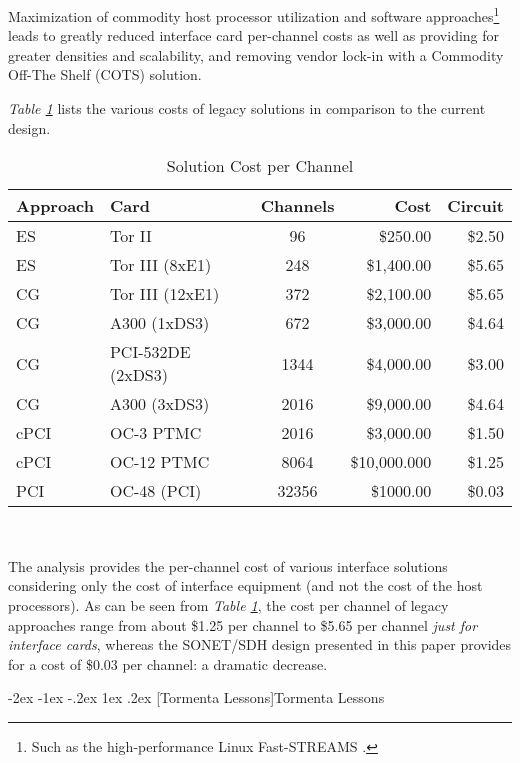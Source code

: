 \documentclass[letterpaper,final,notitlepage,twocolumn,10pt,twoside]{article}
\makeatletter
\let\large = \normalsize
\let\normalsize = \small
\let\small = \footnotesize
\let\footnotesize = \scriptsize
\let\scriptsize = \tiny
\renewcommand\section{\@startsection {section}{1}{\z@}%
                                   {-2ex \@plus -1ex \@minus -.2ex}%
                                   {1ex \@plus .2ex}%
                                   {\normalfont\large\bfseries}}
\makeatother
\begin{document}
Maximization of commodity host processor utilization and software
approaches\footnote{Such as the high-performance Linux Fast-STREAMS
\cite[]{LfS}.} leads to greatly reduced interface card per-channel costs as well
as providing for greater densities and scalability, and removing vendor lock-in
with a Commodity Off-The Shelf (COTS) solution.

\textsl{Table \ref{table:channel}} lists the various costs of legacy solutions
in comparison to the current design.
\begin{table}[htp]
\footnotesize
\begin{center}
\setlength{\tabcolsep}{0.3em}
\setlength{\arraycolsep}{0.3em}
\begin{tabular}{llcrr}\\
Approach & Card & Channels & Cost & Circuit\\
\hline
ES & Tor II & 96 & \$250.00 & \$2.50\\
ES & Tor III (8xE1) & 248 & \$1,400.00 & \$5.65\\
CG & Tor III (12xE1) & 372 & \$2,100.00 & \$5.65\\
CG & A300 (1xDS3) & 672 & \$3,000.00 & \$4.64\\
CG & PCI-532DE (2xDS3) & 1344 & \$4,000.00 & \$3.00\\
CG & A300 (3xDS3) & 2016 & \$9,000.00 & \$4.64\\
cPCI & OC-3 PTMC & 2016 & \$3,000.00 & \$1.50\\
cPCI & OC-12 PTMC & 8064 & \$10,000.000 & \$1.25\\
\hline
PCI & OC-48 (PCI) & 32356 & \$1000.00 & \$0.03\\
\hline
\end{tabular}\\
\caption{Solution Cost per Channel}
\label{table:channel}
\end{center}
\normalsize
\end{table}
The analysis provides the per-channel cost of various interface solutions
considering only the cost of interface equipment (and not the cost of the host
processors).  As can be seen from \textsl{Table \ref{table:channel}}, the cost
per channel of legacy approaches range from about \$1.25 per channel to \$5.65
per channel \textit{just for interface cards}, whereas the SONET/SDH design
presented in this paper provides for a cost of \$0.03 per channel: a dramatic
decrease.

\section[Tormenta Lessons]{Tormenta Lessons}
\end{document}
